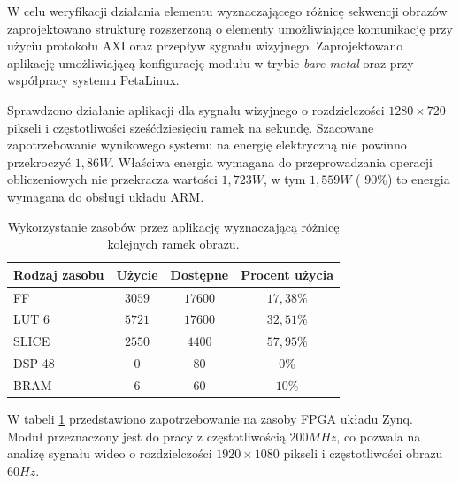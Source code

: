 W celu weryfikacji działania elementu wyznaczającego różnicę sekwencji obrazów zaprojektowano strukturę rozszerzoną o elementy umożliwiające komunikację przy użyciu protokołu AXI oraz przepływ sygnału wizyjnego. 
Zaprojektowano aplikację umożliwiającą konfigurację modułu w trybie \textit{bare-metal} oraz przy współpracy systemu PetaLinux.

Sprawdzono działanie aplikacji dla sygnału wizyjnego o rozdzielczości $1280 \times 720$ pikseli i częstotliwości sześćdziesięciu ramek na sekundę.
Szacowane zapotrzebowanie wynikowego systemu na energię elektryczną nie powinno przekroczyć $1,86W$. Właściwa energia wymagana do przeprowadzania operacji obliczeniowych nie przekracza wartości $1,723W$, w tym $1,559W$ ( $90\%$) to energia wymagana do obsługi układu ARM.

\begin{table}[h]
	\caption{Wykorzystanie zasobów przez aplikację wyznaczającą różnicę kolejnych ramek obrazu.} %
	\centering
	\label{tab;frame-difference-utilization}
	\begin{tabular}{|l|c|c|c|}
		\hline
		\textbf{Rodzaj zasobu} & \textbf{Użycie} & \textbf{Dostępne} & \textbf{Procent użycia}      \\ \hline
		FF                     & $3059$            & $17600$             & $17,38\%$                 \\ \hline
		LUT 6                  & $5721$            & $17600$             & $32,51\%$                 \\ \hline
		SLICE                  & $2550$            & $4400$             & $57,95\%$                 \\ \hline
		DSP 48                 & $0$               & $80$                & $0\%$                    \\ \hline
		BRAM                   & $6$               & $60$                & $10\%$                   \\ \hline
	\end{tabular}
\end{table}

W tabeli \ref{tab;frame-difference-utilization} przedstawiono zapotrzebowanie na zasoby FPGA układu Zynq.
Moduł przeznaczony jest do pracy z częstotliwością $200MHz$, co pozwala na analizę sygnału wideo o rozdzielczości $1920 \times 1080$ pikseli i częstotliwości obrazu $60Hz$.


